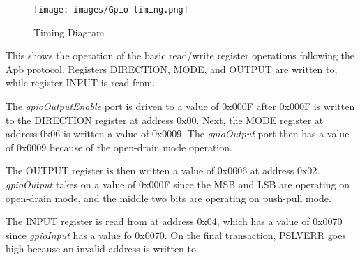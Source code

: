 \begin{figure}[h]
  \texttt{[image: images/Gpio-timing.png]}
  \caption{Timing Diagram}\label{fig:timing}
\end{figure}

This shows the operation of the basic read/write register operations following the Apb protocol. Registers DIRECTION, MODE, and OUTPUT are
written to, while register INPUT is read from.

The \textit{gpioOutputEnable} port is driven to a value of 0x000F after 0x000F is written to the DIRECTION register 
at address 0x00. Next, the MODE register at address 0x06 is written a value of 0x0009. The \textit{gpioOutput} port 
then has a value of 0x0009 because of the open-drain mode operation. 

The OUTPUT register is then written a value of 0x0006 at address 0x02. \textit{gpioOutput} takes on a value of 0x000F
since the MSB and LSB are operating on open-drain mode, and the middle two bits are operating on push-pull mode. 

The INPUT register is read from at address 0x04, which has a value of 0x0070 since \textit{gpioInput} has a value fo 0x0070.
On the final transaction, PSLVERR goes high because an invalid address is written to.

